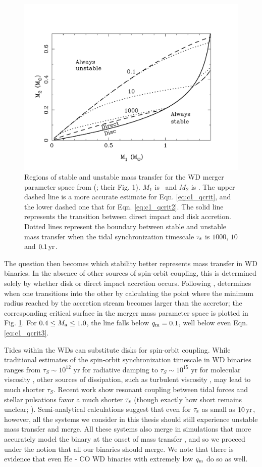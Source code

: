 \begin{figure}
\centering
\includegraphics[angle=0,width=0.6\columnwidth]{introduction/figures/marsns04_stab.pdf}
\caption{Regions of stable and unstable mass transfer for the WD merger parameter space from \citeauthor{marsns04} (\citeyear{marsns04}; their Fig. 1).  $M_1$ is \Ma\, and $M_2$ is \Md.  The upper dashed line is a more accurate estimate for Eqn. \ref{eq:c1_qcrit}, and the lower dashed one that for Eqn. \ref{eq:c1_qcrit2}.  The solid line represents the transition between direct impact and disk accretion.  Dotted lines represent the boundary between stable and unstable mass transfer when the tidal synchronization timescale $\tau_\mathrm{s}$ is $1000$, $10$ and $0.1\,\mathrm{yr}$.}
\label{fig:c1_stability}
\end{figure}

The question then becomes which stability better represents mass transfer in WD binaries.  In the absence of other sources of spin-orbit coupling, this is determined solely by whether disk or direct impact accretion occurs.  Following \citep{lubos75}, \citep{nele+01} determines when one transitions into the other by calculating the point where the minimum radius reached by the accretion stream becomes larger than the accretor; the corresponding critical surface in the merger mass parameter space is plotted in Fig. \ref{fig:c1_stability}.  For $0.4 \leq \Ma \leq 1.0$, the line falls below $\qm = 0.1$, well below even Eqn. \ref{eq:c1_qcrit3}.

Tides within the WDs can substitute disks for spin-orbit coupling.  While traditional estimates of the spin-orbit synchronization timescale in WD binaries ranges from $\tau_{S} \sim 10^{12}$ yr for radiative damping to $\tau_{S} \sim 10^{15}$ yr for molecular viscosity \citep{marsns04}, other sources of dissipation, such as turbulent viscosity \citep{mochl89}, may lead to much shorter $\tau_{S}$.  Recent work \citep{fulll12, burk+13, fulll14} show resonant coupling between tidal forces and stellar pulsations favor a much shorter $\tau_\mathrm{s}$ (though exactly how short remains unclear; \citealt{fulll14}).  Semi-analytical calculations \citep{marsns04,gokhpf07, kremsk15} suggest that even for $\tau_\mathrm{s}$ as small as $10\,\mathrm{yr}$, however, all the systems we consider in this thesis should still experience unstable mass transfer and merge.  All these systems also merge in simulations that more accurately model the binary at the onset of mass transfer \citep{dan+11, dan+12}, and so we proceed under the notion that all our binaries should merge.  We note that there is evidence \citep{shen15, brow+16} that even He - CO WD binaries with extremely low $\qm$ do so as well.


